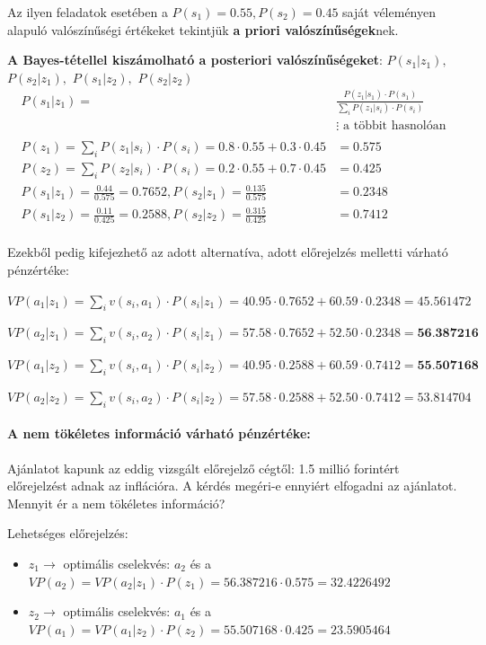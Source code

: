 \documentclass[a4paper,12pt]{article}
\begin{document}
Az ilyen feladatok esetében a $P(s_1) = 0.55 , P(s_2) = 0.45$ saját véleményen alapuló valószínűségi értékeket tekintjük \textbf{a priori valószínűségek}nek. 

\textbf{A Bayes-tétellel kiszámolható a posteriori valószínűségeket}: $P(s_1|z_1),$ $P(s_2|z_1),$ $ P(s_1|z_2),$ $P(s_2|z_2)$
\begin{equation}
\begin{split}
P(s_1|z_1) =& \frac{P(z_{1}|s_1) \cdot  P(s_1)}{\sum_{i}^{ } P(z_{1}|s_i) \cdot  P(s_i)} \\
&\vdots \text{ a többit hasnolóan} \\
\\
P(z_1)=\sum_{i}^{ } P(z_{1}|s_i) \cdot  P(s_i) =  0.8\cdot 0.55+0.3\cdot 0.45 &= 0.575 \\
P(z_2)=\sum_{i}^{ } P(z_{2}|s_i) \cdot  P(s_i) =  0.2\cdot 0.55+0.7\cdot 0.45 &= 0.425 \\
P(s_1|z_1) = \frac{0.44}{0.575} = 0.7652,  
P(s_2|z_1) = \frac{0.135}{0.575} &= 0.2348 \\
P(s_1|z_2) = \frac{0.11}{0.425} = 0.2588,
P(s_2|z_2) = \frac{0.315}{0.425} &= 0.7412
\\
\end{split}
\end{equation}

Ezekből pedig kifejezhető az adott alternatíva, adott előrejelzés melletti várható pénzértéke:

$VP(a_1|z_1) = \sum_{i}^{ }v(s_i,a_1)\cdot P(s_i|z_1) = 40.95\cdot 0.7652 + 60.59\cdot 0.2348 = 45.561472$ 
 
$VP(a_2|z_1) = \sum_{i}v(s_i,a_2)\cdot P(s_i|z_1) = 57.58\cdot 0.7652 + 52.50\cdot 0.2348 = \textbf{56.387216}$ 

$VP(a_1|z_2) = \sum_{i}v(s_i,a_1)\cdot P(s_i|z_2) = 40.95\cdot 0.2588 + 60.59\cdot 0.7412 = \textbf{55.507168}$  

$VP(a_2|z_2) = \sum_{i}v(s_i,a_2)\cdot P(s_i|z_2) = 57.58\cdot 0.2588 + 52.50\cdot 0.7412 = 53.814704$

\paragraph{A nem tökéletes információ várható pénzértéke: }

Ajánlatot kapunk az eddig vizsgált előrejelző cégtől: 1.5 millió forintért előrejelzést adnak az inflációra. A kérdés megéri-e ennyiért elfogadni az ajánlatot. Mennyit ér a nem tökéletes információ?

Lehetséges előrejelzés:
\begin{itemize}
\item $z_{1} \rightarrow$ optimális cselekvés: $a_2$  és a $VP(a_2) = VP(a_2|z_1) \cdot  P(z_1) = 56.387216\cdot 0.575 = 32.4226492$
\item $z_{2} \rightarrow$ optimális cselekvés: $a_1$  és a $VP(a_1) = VP(a_1|z_2) \cdot  P(z_2) = 55.507168\cdot 0.425 = 23.5905464$
\end{itemize}
\end{document}
